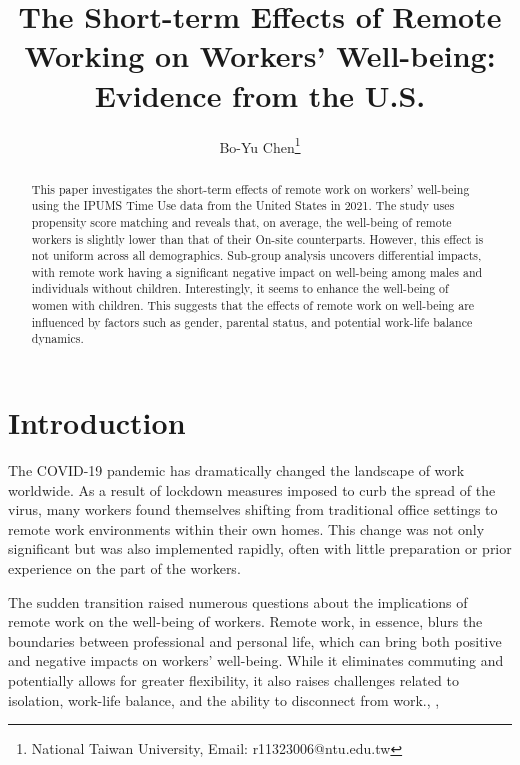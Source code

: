 \documentclass[12pt]{article}
\begin{document}
	
	\title{\Large The Short-term Effects of Remote Working on Workers' Well-being: Evidence from the U.S.}
	
	\author{\normalsize Bo-Yu Chen\thanks{National Taiwan University, Email: r11323006@ntu.edu.tw}\medskip}
	
	
	\maketitle
	
\begin{abstract}
This paper investigates the short-term effects of remote work on workers’ well-being using the IPUMS Time Use data from the United States in 2021. The study uses propensity score matching and reveals that, on average, the well-being of remote workers is slightly lower than that of their On-site counterparts.  However, this effect is not uniform across all demographics. Sub-group analysis uncovers differential impacts, with remote work having a significant negative impact on well-being among males and individuals without children. Interestingly, it seems to enhance the well-being of women with children. This suggests that the effects of remote work on well-being are influenced by factors such as gender, parental status, and potential work-life balance dynamics. 
\end{abstract}


\newpage

\section{Introduction}
The COVID-19 pandemic has dramatically changed the landscape of work worldwide. As a result of lockdown measures imposed to curb the spread of the virus, many workers found themselves shifting from traditional office settings to remote work environments within their own homes. This change was not only significant but was also implemented rapidly, often with little preparation or prior experience on the part of the workers.

The sudden transition raised numerous questions about the implications of remote work on the well-being of workers. Remote work, in essence, blurs the boundaries between professional and personal life, which can bring both positive and negative impacts on workers' well-being. While it eliminates commuting and potentially allows for greater flexibility, it also raises challenges related to isolation, work-life balance, and the ability to disconnect from work.\citep{bertoni2021remote}, \citep{banks2021mental}, \citep{RePEc:cam:camdae:2037}
\end{document}
